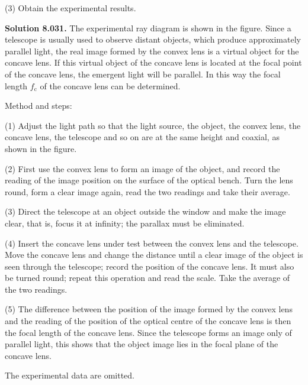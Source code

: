 (3) Obtain the experimental results.

\textbf{Solution 8.03}\quad \textbf{1.} The experimental ray diagram is shown in the figure. Since a telescope is usually used to observe distant objects, which produce approximately parallel light, the real image formed by the convex lens is a virtual object for the concave lens. If this virtual object of the concave lens is located at the focal point of the concave lens, the emergent light will be parallel. In this way the focal length $f_{\mathrm{c}}$ of the concave lens can be determined.

Method and steps:

(1) Adjust the light path so that the light source, the object, the convex lens, the concave lens, the telescope and so on are at the same height and coaxial, as shown in the figure.

(2) First use the convex lens to form an image of the object, and record the reading of the image position on the surface of the optical bench. Turn the lens round, form a clear image again, read the two readings and take their average.

(3) Direct the telescope at an object outside the window and make the image clear, that is, focus it at infinity; the parallax must be eliminated.

(4) Insert the concave lens under test between the convex lens and the telescope. Move the concave lens and change the distance until a clear image of the object is seen through the telescope; record the position of the concave lens. It must also be turned round; repeat this operation and read the scale. Take the average of the two readings.

(5) The difference between the position of the image formed by the convex lens and the reading of the position of the optical centre of the concave lens is then the focal length of the concave lens. Since the telescope forms an image only of parallel light, this shows that the object image lies in the focal plane of the concave lens.

The experimental data are omitted.

